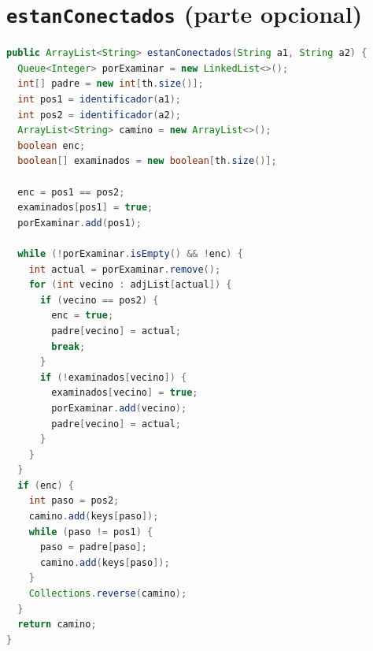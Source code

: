 \documentclass[a4paper,11pt]{report}
\begin{document}
\section{\texttt{estanConectados} (parte opcional)}
\par\noindent\begin{minipage}{\linewidth}
\begin{lstlisting}[language=Java]
public ArrayList<String> estanConectados(String a1, String a2) {
  Queue<Integer> porExaminar = new LinkedList<>();
  int[] padre = new int[th.size()];
  int pos1 = identificador(a1);
  int pos2 = identificador(a2);
  ArrayList<String> camino = new ArrayList<>();
  boolean enc;
  boolean[] examinados = new boolean[th.size()];

  enc = pos1 == pos2;
  examinados[pos1] = true;
  porExaminar.add(pos1);

  while (!porExaminar.isEmpty() && !enc) {
    int actual = porExaminar.remove();
    for (int vecino : adjList[actual]) {
      if (vecino == pos2) {
        enc = true;
        padre[vecino] = actual;
        break;
      }
      if (!examinados[vecino]) {
        examinados[vecino] = true;
        porExaminar.add(vecino);
        padre[vecino] = actual;
      }
    }
  }
  if (enc) {
    int paso = pos2;
    camino.add(keys[paso]);
    while (paso != pos1) {
      paso = padre[paso];
      camino.add(keys[paso]);
    }
    Collections.reverse(camino);
  }
  return camino;
}
\end{lstlisting}
\end{minipage}\par
\end{document}
